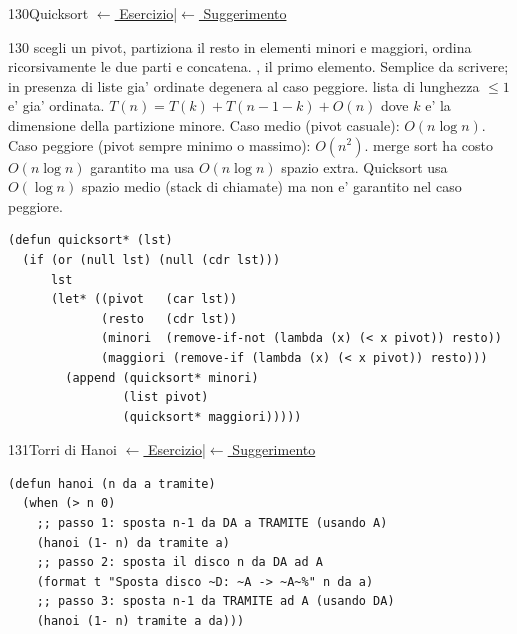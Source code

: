 \label{sol:130}
\begin{solbox}{130}{Quicksort}
\small\color{black!55}\hyperref[ex:130]{$\leftarrow$ Esercizio}\enspace\textcolor{black!30}{|}\enspace\hyperref[hint:130]{$\leftarrow$ Suggerimento}\normalsize\color{black}
\begin{ragionamentoBox}{130}
 scegli un pivot, partiziona il resto in elementi minori
e maggiori, ordina ricorsivamente le due parti e concatena.
 , il primo elemento. Semplice da scrivere;
in presenza di liste gia' ordinate degenera al caso peggiore.
 lista di lunghezza $\le 1$ e' gia' ordinata.
 $T(n) = T(k) + T(n-1-k) + O(n)$
dove $k$ e' la dimensione della partizione minore.
Caso medio (pivot casuale): $O(n \log n)$.
Caso peggiore (pivot sempre minimo o massimo): $O(n^2)$.
 merge sort ha costo $O(n \log n)$
garantito ma usa $O(n \log n)$ spazio extra.
Quicksort usa $O(\log n)$ spazio medio (stack di chiamate)
ma non e' garantito nel caso peggiore.
\end{ragionamentoBox}
\begin{lstlisting}
(defun quicksort* (lst)
  (if (or (null lst) (null (cdr lst)))
      lst
      (let* ((pivot   (car lst))
             (resto   (cdr lst))
             (minori  (remove-if-not (lambda (x) (< x pivot)) resto))
             (maggiori (remove-if (lambda (x) (< x pivot)) resto)))
        (append (quicksort* minori)
                (list pivot)
                (quicksort* maggiori)))))
\end{lstlisting}
\end{solbox}

\label{sol:131}
\begin{solbox}{131}{Torri di Hanoi}
\small\color{black!55}\hyperref[ex:131]{$\leftarrow$ Esercizio}\enspace\textcolor{black!30}{|}\enspace\hyperref[hint:131]{$\leftarrow$ Suggerimento}\normalsize\color{black}
\begin{lstlisting}
(defun hanoi (n da a tramite)
  (when (> n 0)
    ;; passo 1: sposta n-1 da DA a TRAMITE (usando A)
    (hanoi (1- n) da tramite a)
    ;; passo 2: sposta il disco n da DA ad A
    (format t "Sposta disco ~D: ~A -> ~A~%" n da a)
    ;; passo 3: sposta n-1 da TRAMITE ad A (usando DA)
    (hanoi (1- n) tramite a da)))
\end{lstlisting}
\end{solbox}

